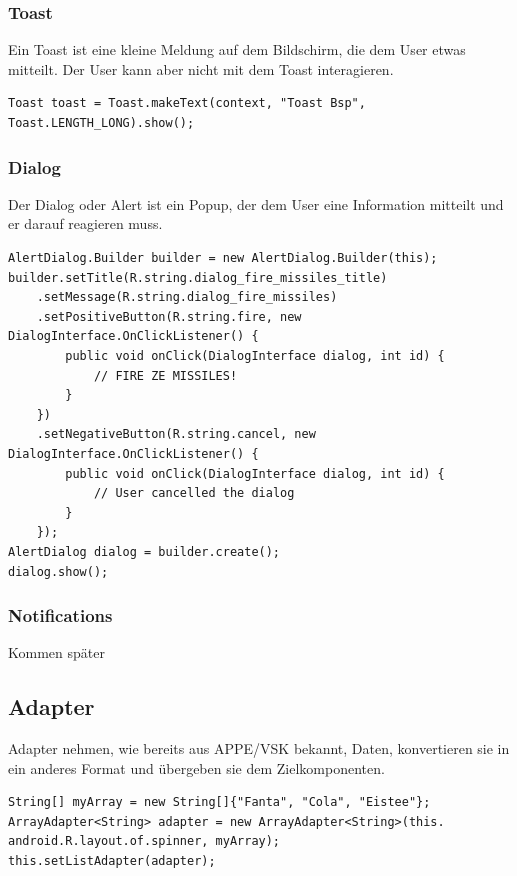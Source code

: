 \documentclass[a4paper, 11pt]{article}
\begin{document}
\subsubsection{Toast}
Ein Toast ist eine kleine Meldung auf dem Bildschirm, die dem User etwas mitteilt. Der User kann aber nicht mit dem Toast interagieren.

\begin{lstlisting}[caption={Toast-Beispiel}]
Toast toast = Toast.makeText(context, "Toast Bsp", Toast.LENGTH_LONG).show();
\end{lstlisting}

\subsubsection{Dialog}
Der Dialog oder Alert ist ein Popup, der dem User eine Information mitteilt und er darauf reagieren muss.

\begin{lstlisting}[caption={Alert-Beispiel}]
AlertDialog.Builder builder = new AlertDialog.Builder(this);
builder.setTitle(R.string.dialog_fire_missiles_title)
	.setMessage(R.string.dialog_fire_missiles)
	.setPositiveButton(R.string.fire, new DialogInterface.OnClickListener() {
		public void onClick(DialogInterface dialog, int id) {
			// FIRE ZE MISSILES!
		}
	})
	.setNegativeButton(R.string.cancel, new DialogInterface.OnClickListener() {
		public void onClick(DialogInterface dialog, int id) {
			// User cancelled the dialog
		}
	});
AlertDialog dialog = builder.create();
dialog.show();
\end{lstlisting}

\subsubsection{Notifications}
Kommen später

\subsection{Adapter}
Adapter nehmen, wie bereits aus APPE/VSK bekannt, Daten, konvertieren sie in ein anderes Format und übergeben sie dem Zielkomponenten.

\begin{lstlisting}[caption={Array-Adapter um String Array in Spinner zu füllen}]
String[] myArray = new String[]{"Fanta", "Cola", "Eistee"};
ArrayAdapter<String> adapter = new ArrayAdapter<String>(this. android.R.layout.of.spinner, myArray);
this.setListAdapter(adapter);
\end{lstlisting}
\end{document}
